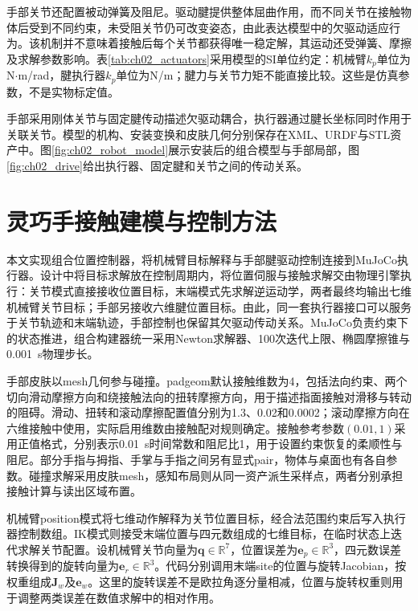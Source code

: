 手部关节还配置被动弹簧及阻尼。驱动腱提供整体屈曲作用，而不同关节在接触物体后受到不同约束，未受阻关节仍可改变姿态，由此表达模型中的欠驱动适应行为。该机制并不意味着接触后每个关节都获得唯一稳定解，其运动还受弹簧、摩擦及求解参数影响。表\ref{tab:ch02_actuators}采用模型的SI单位约定：机械臂$k_p$单位为N$\cdot$m/rad，腱执行器$k_p$单位为N/m；腱力与关节力矩不能直接比较。这些是仿真参数，不是实物标定值。

手部采用刚体关节与固定腱传动描述欠驱动耦合，执行器通过腱长坐标同时作用于关联关节。模型的机构、安装变换和皮肤几何分别保存在XML、URDF与STL资产中。图\ref{fig:ch02_robot_model}展示安装后的组合模型与手部局部，图\ref{fig:ch02_drive}给出执行器、固定腱和关节之间的传动关系。

\section{灵巧手接触建模与控制方法}
\label{sec:contact_control}

本文实现组合位置控制器，将机械臂目标解释与手部腱驱动控制连接到MuJoCo执行器。设计中将目标求解放在控制周期内，将位置伺服与接触求解交由物理引擎执行：关节模式直接接收位置目标，末端模式先求解逆运动学，两者最终均输出七维机械臂关节目标；手部另接收六维腱位置目标。由此，同一套执行器接口可以服务于关节轨迹和末端轨迹，手部控制也保留其欠驱动传动关系。MuJoCo负责约束下的状态推进\cite{todorov2012mujoco,mujoco2026computation}，组合构建器统一采用Newton求解器、100次迭代上限、椭圆摩擦锥与0.001~s物理步长。

手部皮肤以mesh几何参与碰撞。padgeom默认接触维数为4，包括法向约束、两个切向滑动摩擦方向和绕接触法向的扭转摩擦方向，用于描述指面接触对滑移与转动的阻碍\cite{mujoco2026xml}。滑动、扭转和滚动摩擦配置值分别为1.3、0.02和0.0002；滚动摩擦方向在六维接触中使用，实际启用维数由接触配对规则确定。接触参考参数$(0.01,1)$采用正值格式，分别表示0.01~s时间常数和阻尼比1，用于设置约束恢复的柔顺性与阻尼。部分手指与拇指、手掌与手指之间另有显式pair，物体与桌面也有各自参数。碰撞求解采用皮肤mesh，感知布局则从同一资产派生采样点，两者分别承担接触计算与读出区域布置。

机械臂position模式将七维动作解释为关节位置目标，经合法范围约束后写入执行器控制数组。IK模式则接受末端位置与四元数组成的七维目标，在临时状态上迭代求解关节配置。设机械臂关节向量为$\boldsymbol q\in\mathbb R^7$，位置误差为$\boldsymbol e_p\in\mathbb R^3$，四元数误差转换得到的旋转向量为$\boldsymbol e_r\in\mathbb R^3$。代码分别调用末端site的位置与旋转Jacobian，按权重组成$\boldsymbol J_w$及$\boldsymbol e_w$。这里的旋转误差不是欧拉角逐分量相减，位置与旋转权重则用于调整两类误差在数值求解中的相对作用。

